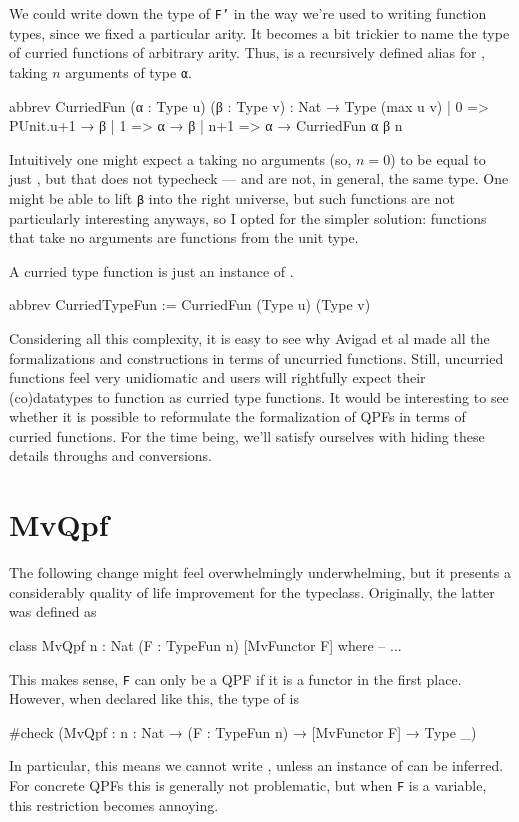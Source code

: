 \documentclass[titlepage]{report}
\begin{document}
We could write down the type of \texttt{F'} in the way we're used to writing function types, since
we fixed a particular arity. 
It becomes a bit trickier to name the type of curried functions of arbitrary arity.
Thus,  is a recursively defined alias for , 
taking $n$ arguments of type \texttt{α}.
\begin{leancode}
    abbrev CurriedFun (α : Type u) (β : Type v) : Nat → Type (max u v)
      | 0   => PUnit.{u+1} → β
      | 1   => α → β
      | n+1 => α → CurriedFun α β n
\end{leancode}
Intuitively one might expect a  taking no arguments (so, $n = 0$) to be equal to 
just , but that does not typecheck ---  and  are not, in general, the same type.
One might be able to lift \texttt{β} into the right universe, but such functions are not particularly
interesting anyways, so I opted for the simpler solution: functions that take no arguments are
functions from the unit type.

A curried type function is just an instance of .
\begin{leancode}
    abbrev CurriedTypeFun := CurriedFun (Type u) (Type v)
\end{leancode}



Considering all this complexity, it is easy to see why Avigad et al made all the formalizations and
constructions in terms of uncurried functions. 
Still, uncurried functions feel very unidiomatic and users will rightfully expect their (co)datatypes
to function as curried type functions. 
It would be interesting to see whether it is possible to reformulate the formalization of QPFs in
terms of curried functions. 
For the time being, we'll satisfy ourselves with hiding these details throughs
 and  conversions.



\section{MvQpf}
The following change might feel overwhelmingly underwhelming, but it presents a considerably quality 
of life improvement for the  typeclass. Originally, the latter was defined as
\begin{leancode}
    class MvQpf {n : Nat} (F : TypeFun n) [MvFunctor F] where
        -- ...
\end{leancode}
This makes sense, \texttt{F} can only be a QPF if it is a functor in the first place.
However, when declared like this, the type of  is 
\begin{leancode}
    #check (MvQpf : {n : Nat} → (F : TypeFun n) → [MvFunctor F] → Type _)
\end{leancode}
In particular, this means we cannot write , unless an instance of 
can be inferred. For concrete QPFs this is generally not problematic, but when \texttt{F} is a
variable, this restriction becomes annoying. 
\end{document}
